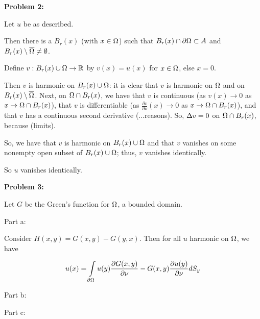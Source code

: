 \documentclass[a4paper,12pt]{article}
\begin{document}
{\bf Problem 2:}

Let $u$ be as described. %

Then there is a $B_r(x)$ (with $x \in \Omega$) such that $B_r(x) \cap \partial \Omega \subset A$ and $B_r(x) \setminus \overline{\Omega} \neq \emptyset$.

Define $v: B_r(x) \cup \Omega \to \mathbb{R}$ by $v(x) = u(x)$ for $x \in \Omega$, else $x = 0$.

Then $v$ is harmonic on $B_r(x) \cup \Omega$: it is clear that $v$ is harmonic on $\Omega$ and on $B_r(x) \setminus \overline{\Omega}$. Next, on $\Omega\cap B_r(x)$, we have that $v$ is continuous (as $v(x) \to 0$ as $x \to \Omega\cap B_r(x)$), that $v$ is differentiable (as $\frac{\partial v}{\partial \nu}(x) \to 0$ as $x \to \Omega \cap B_r(x)$), and that $v$ has a continuous second derivative (...reasons). So, $\Delta v = 0$ on $\Omega \cap B_r(x)$, because (limits). %

So, we have that $v$ is harmonic on $B_r(x) \cup \Omega$ and that $v$ vanishes on some nonempty open subset of $B_r(x) \cup \Omega$; thus, $v$ vanishes identically.

So $u$ vanishes identically. 

\shunt

{\bf Problem 3:}


Let $G$ be the Green's function for $\Omega$, a bounded domain.

Part a:

Consider $H(x,y) = G(x,y) - G(y,x)$. Then for all $u$ harmonic on $\Omega$, we have

\begin{align*}
u(x) &= \int\limits_{\partial \Omega} u(y) \frac{\partial G(x,y)}{\partial \nu} - G(x,y) \frac{\partial u(y)}{\partial \nu} dS_y\\
\end{align*}


\shunt

Part b:



\shunt

Part c:


\shunt
\end{document}
